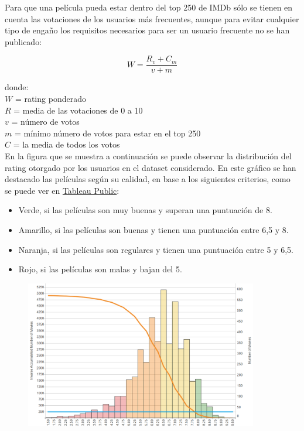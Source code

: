 \documentclass{article}
\begin{document}
Para que una película pueda estar dentro del top 250 de IMDb sólo se tienen en cuenta las votaciones de los usuarios más frecuentes, aunque para evitar cualquier tipo de engaño los requisitos necesarios para ser un usuario frecuente no se han publicado:

\begin{equation}
W=\frac{R_{v}+C_{m}}{v+m}
\end{equation}

\noindent
donde:\\

\indent
$W$ = rating ponderado\\
\indent
$R$ = media de las votaciones de 0 a 10\\
\indent
$v$ = número de votos\\
\indent
$m$ = mínimo número de votos para estar en el top 250\\
\indent
$C$ = la media de todos los votos\\

En la figura que se muestra a continuación se puede observar la distribución del rating otorgado por los usuarios en el dataset considerado. En este gráfico se han destacado las películas según su calidad, en base a los siguientes criterios, como se puede ver en \href{https://public.tableau.com/profile/javier6580\#!/vizhome/proyecto_fin_de_master_dataset/rating_distribution}{Tableau Public}:

\begin{itemize}
  \item Verde, si las películas son muy buenas y superan una puntuación de 8.
  \item Amarillo, si las películas son buenas y tienen una puntuación entre 6,5 y 8.
  \item Naranja, si las películas son regulares y tienen una puntuación entre 5 y 6,5.
  \item Rojo, si las películas son malas y bajan del 5.
\end{itemize}

\begin{figure}[h]
\centering
\includegraphics[width=4in,clip,keepaspectratio]{./images_latex/rating_distribution}
\label{fig:imdb_rating_distribution}
\end{figure}
\end{document}
